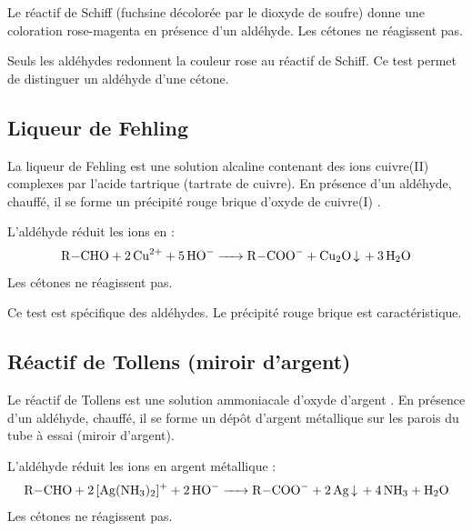 \begin{experience}
Le réactif de Schiff (fuchsine décolorée par le dioxyde de soufre) donne une coloration rose-magenta en présence d'un aldéhyde. Les cétones ne réagissent pas.
\end{experience}

\begin{propriete}
Seuls les aldéhydes redonnent la couleur rose au réactif de Schiff. Ce test permet de distinguer un aldéhyde d'une cétone.
\end{propriete}

\subsection{Liqueur de Fehling}

\begin{experience}
La liqueur de Fehling est une solution alcaline contenant des ions cuivre(II) complexes par l'acide tartrique (tartrate de cuivre). En présence d'un aldéhyde, chauffé, il se forme un précipité rouge brique d'oxyde de cuivre(I) .
\end{experience}

\begin{propriete}
L'aldéhyde réduit les ions  en  :
\[
\ce{R-CHO + 2 Cu^2+ + 5 HO- -> R-COO- + Cu2O v + 3 H2O}
\]
Les cétones ne réagissent pas.
\end{propriete}

\begin{remarque}
Ce test est spécifique des aldéhydes. Le précipité rouge brique est caractéristique.
\end{remarque}

\subsection{Réactif de Tollens (miroir d'argent)}

\begin{experience}
Le réactif de Tollens est une solution ammoniacale d'oxyde d'argent \ce{[Ag(NH3)2]+}. En présence d'un aldéhyde, chauffé, il se forme un dépôt d'argent métallique sur les parois du tube à essai (miroir d'argent).
\end{experience}

\begin{propriete}
L'aldéhyde réduit les ions  en argent métallique :
\[
\ce{R-CHO + 2 [Ag(NH3)2]+ + 2 HO- -> R-COO- + 2 Ag v + 4 NH3 + H2O}
\]
Les cétones ne réagissent pas.
\end{propriete}

